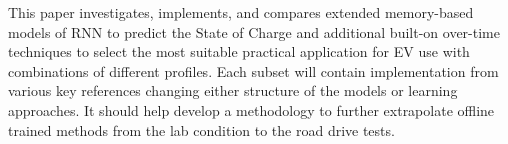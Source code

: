 %
%
%
%
%
This paper investigates, implements, and compares extended memory-based models of RNN to predict the State of Charge and additional built-on over-time techniques to select the most suitable practical application for EV use with combinations of different profiles.
Each subset will contain implementation from various key references changing either structure of the models or learning approaches.
It should help develop a methodology to further extrapolate offline trained methods from the lab condition to the road drive tests.
